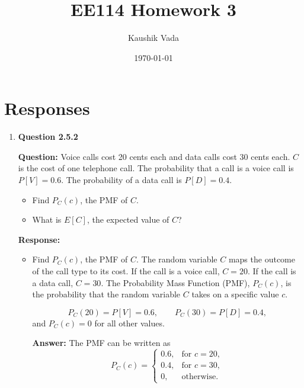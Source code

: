 \documentclass[12pt]{article}
\title{EE114 Homework 3}
\author{Kaushik Vada}
\date{\today}
\begin{document}
\maketitle

\onehalfspacing

\newcommand{\answerspace}{\vspace{2.0in}}

\section*{Responses}

\begin{enumerate}[label=\textbf{\arabic*.}, leftmargin=*]

\item \textbf{Question 2.5.2}

\textbf{Question:} Voice calls cost 20 cents each and data calls cost 30 cents each. $C$ is the cost of one telephone call. The probability that a call is a voice call is $P[V]=0.6$. The probability of a data call is $P[D]=0.4$.
\begin{itemize}
  \item[(a)] Find $P_C(c)$, the PMF of $C$.
  \item[(b)] What is $E[C]$, the expected value of $C$?
\end{itemize}

\vspace{0.3in}

\textbf{Response:}

\begin{itemize}
  \item[(a)] Find $P_C(c)$, the PMF of $C$. The random variable $C$ maps the outcome of the call type to its cost. If the call is a voice call, $C=20$. If the call is a data call, $C=30$. The Probability Mass Function (PMF), $P_C(c)$, is the probability that the random variable $C$ takes on a specific value $c$.

  \[
  P_C(20)=P[V]=0.6,\qquad P_C(30)=P[D]=0.4,
  \]
  and $P_C(c)=0$ for all other values.

  \textbf{Answer:} The PMF can be written as
  \[
  P_C(c)=
  \begin{cases}
  0.6, & \text{for } c=20,\\
  0.4, & \text{for } c=30,\\
  0, & \text{otherwise.}
  \end{cases}
  \]


\end{itemize}
\end{enumerate}
\end{document}
